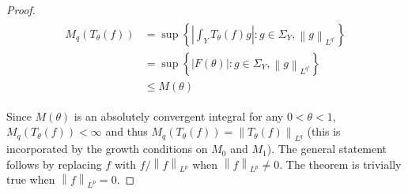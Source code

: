\begin{proof}
	\begin{gather*}
		\begin{aligned}
			M_q\left(T_\theta(f)\right) &= \sup\left\{ \left| \int_Y T_\theta(f) g\right| : g \in \Sigma_Y, \left\|g \right\|_{L^{q'}}\right\}\\
			&= \sup\left\{ \left| F(\theta)\right| : g \in \Sigma_Y, \left\| g \right\|_{L^{q'}}\right\}\\
			&\leqslant M(\theta)
		\end{aligned}
	\end{gather*}

	Since $M(\theta)$ is an absolutely convergent integral for any $0 < \theta < 1$, $M_q\left(T_\theta(f)\right) < \infty$ and thus $M_q\left(T_\theta(f)\right) = \left\| T_\theta(f)\right\|_{L^q}$ (this is incorporated by the growth conditions on $M_0$ and $M_1$). The general statement follows by replacing $f$ with $f/\left\| f\right\|_{L^p}$ when $\left\|f \right\|_{L^p} \neq 0$. The theorem is trivially true when $\left\| f\right\|_{L^p} = 0$.
\end{proof}
